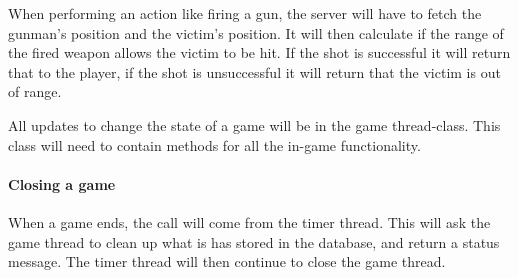 When performing an action like firing a gun, the server will have to fetch the gunman's position and the victim's position. It will then calculate if the range of the fired weapon allows the victim to be hit. If the shot is successful it will return that to the player, if the shot is unsuccessful it will return that the victim is out of range. 

All updates to change the state of a game will be in the game thread-class. This class will need to contain methods for all the in-game functionality. 

\paragraph{Closing a game}
When a game ends, the call will come from the timer thread. This will ask the game thread to clean up what is has stored in the database, and return a status message. The timer thread will then continue to close the game thread. 